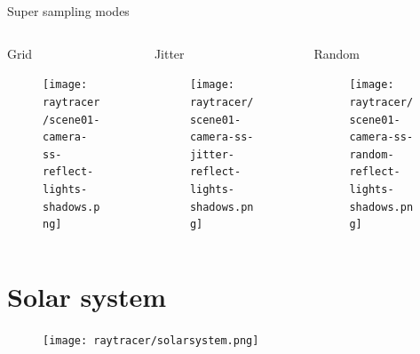 \documentclass{beamer}
\begin{document}
\begin{frame}
	Super sampling modes
	\begin{columns}[T]
		\begin{column}{.33\textwidth}
			Grid
			\begin{figure}
				\texttt{[image: raytracer/scene01-camera-ss-reflect-lights-shadows.png]}
			\end{figure}
		\end{column}
		\begin{column}{.33\textwidth}
			Jitter
			\begin{figure}
				\texttt{[image: raytracer/scene01-camera-ss-jitter-reflect-lights-shadows.png]}
				\end{figure}
		\end{column}
		\begin{column}{.33\textwidth}
			Random
			\begin{figure}
				\texttt{[image: raytracer/scene01-camera-ss-random-reflect-lights-shadows.png]}
				\end{figure}
		\end{column}
	\end{columns}
\end{frame}

\section{Solar system}
\begin{frame}
	\begin{figure}
		\texttt{[image: raytracer/solarsystem.png]}
	\end{figure}
\end{frame}
\end{document}
